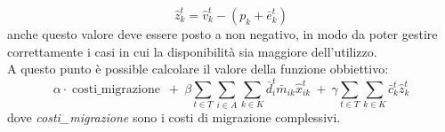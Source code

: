 \begin{equation}
    \hat{z}^t_k = \hat{v}^t_k - \left(p_k + \bar{e}^t_k\right)
\end{equation}
anche questo valore deve essere posto a non negativo, in modo da poter gestire correttamente i casi in cui la disponibilità sia maggiore dell'utilizzo.\\
A questo punto è possible calcolare il valore della funzione obbiettivo:
\begin{equation}
    \alpha \cdot \operatorname{costi\_migrazione} ~ + ~ \beta \sum_{t \in T}\sum_{i \in A}\sum_{k \in K}\bar{d}^t_i\bar{m}_{ik}\hat{x}^t_{ik} ~ + ~ \gamma \sum_{t \in T} \sum_{k \in K}\bar{c}^t_k\hat{z}^t_k
\end{equation}
dove \textit{costi\_migrazione} sono i costi di migrazione complessivi.
